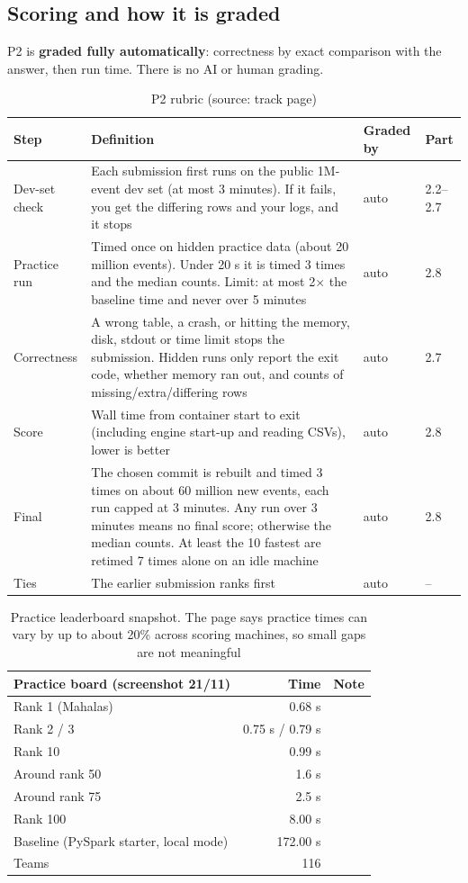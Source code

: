 \documentclass[a4paper,12pt]{article}
\newcommand{\src}[1]{{\footnotesize\textcolor{p7}{(source: #1)}}}
\begin{document}
\subsection{Scoring and how it is graded}
P2 is \textbf{graded fully automatically}: correctness by exact comparison with the answer, then run time. There is no AI or human grading.

\begin{table}[H]
\centering\small
\begin{tabularx}{\textwidth}{L{3.3cm}YC{1.9cm}C{1.6cm}}
\toprule
\textbf{Step} & \textbf{Definition} & \textbf{Graded by} & \textbf{Part} \\
\midrule
Dev-set check & Each submission first runs on the public 1M-event dev set (at most 3 minutes). If it fails, you get the differing rows and your logs, and it stops & auto & 2.2--2.7 \\
Practice run & Timed once on hidden practice data (about 20 million events). Under 20 s it is timed 3 times and the median counts. Limit: at most 2$\times$ the baseline time and never over 5 minutes & auto & 2.8 \\
Correctness & A wrong table, a crash, or hitting the memory, disk, stdout or time limit stops the submission. Hidden runs only report the exit code, whether memory ran out, and counts of missing/extra/differing rows & auto & 2.7 \\
Score & Wall time from container start to exit (including engine start-up and reading CSVs), lower is better & auto & 2.8 \\
Final & The chosen commit is rebuilt and timed 3 times on about 60 million new events, each run capped at 3 minutes. Any run over 3 minutes means no final score; otherwise the median counts. At least the 10 fastest are retimed 7 times alone on an idle machine & auto & 2.8 \\
Ties & The earlier submission ranks first & auto & -- \\
\bottomrule
\end{tabularx}
\caption{P2 rubric \src{track page}}
\end{table}

\begin{table}[H]
\centering\small
\begin{tabular}{lrl}
\toprule
\textbf{Practice board (screenshot 21/11)} & \textbf{Time} & \textbf{Note} \\
\midrule
Rank 1 (Mahalas) & 0.68 s & \\
Rank 2 / 3 & 0.75 s / 0.79 s & \\
Rank 10 & 0.99 s & \\
Around rank 50 & 1.6 s & \\
Around rank 75 & 2.5 s & \\
Rank 100 & 8.00 s & \\
Baseline (PySpark starter, local mode) & 172.00 s & \\
Teams & 116 & \\
\bottomrule
\end{tabular}
\caption{Practice leaderboard snapshot. The page says practice times can vary by up to about 20\% across scoring machines, so small gaps are not meaningful}
\end{table}
\end{document}
